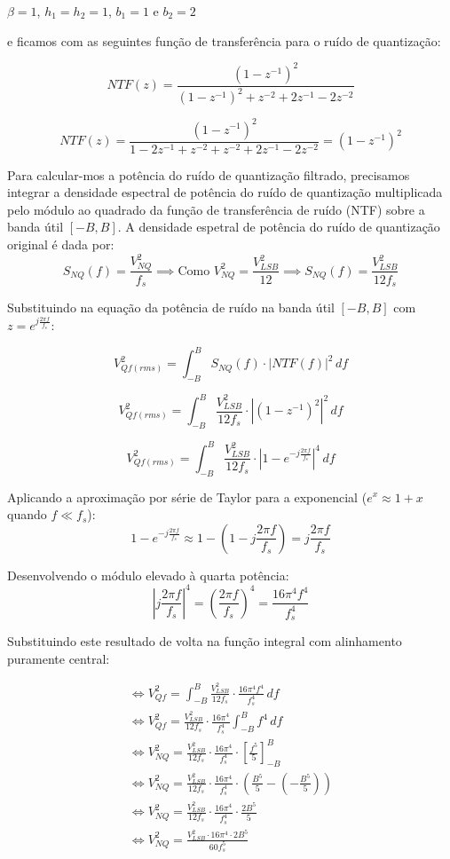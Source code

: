 \begin{center}
    $\beta = 1$, $h_1 = h_2 = 1$, $b_1 = 1$ e $b_2 = 2$
\end{center}

e ficamos com as seguintes função de transferência para o ruído de quantização:

\[ NTF(z) = \frac{(1 - z^{-1})^2}{(1 - z^{-1})^2 + z^{-2} + 2z^{-1} - 2z^{-2}} \]

\[ NTF(z) = \frac{(1 - z^{-1})^2}{1 - 2z^{-1} + z^{-2} + z^{-2} + 2z^{-1} - 2z^{-2}} = (1 - z^{-1})^2 \]

Para calcular-mos a potência do ruído de quantização filtrado, precisamos integrar a densidade espectral de
potência do ruído de quantização multiplicada pelo módulo ao quadrado da função de transferência de ruído (NTF) sobre a banda útil $[-B, B]$.
A densidade espetral de potência do ruído de quantização original é dada por:
\[ S_{NQ}(f) = \frac{V_{NQ}^2}{f_s} \implies \text{Como } V_{NQ}^2 = \frac{V_{LSB}^2}{12} \implies S_{NQ}(f) = \frac{V_{LSB}^2}{12f_s} \]

Substituindo na equação da potência de ruído na banda útil $[-B, B]$ com $z = e^{j\frac{2\pi f}{f_s}}$:

\[ V_{Qf(rms)}^2 = \int_{-B}^{B} S_{NQ}(f) \cdot |NTF(f)|^2 \, df \]

\[ V_{Qf(rms)}^2 = \int_{-B}^{B} \frac{V_{LSB}^2}{12f_s} \cdot \left| (1 - z^{-1})^2 \right|^2 \, df \]

\[ V_{Qf(rms)}^2 = \int_{-B}^{B} \frac{V_{LSB}^2}{12f_s} \cdot \left| 1 - e^{-j\frac{2\pi f}{f_s}} \right|^4 \, df \]

Aplicando a aproximação por série de Taylor para a exponencial ($e^x \approx 1 + x$ quando $f \ll f_s$):
\[ 1 - e^{-j\frac{2\pi f}{f_s}} \approx 1 - \left(1 - j\frac{2\pi f}{f_s}\right) = j\frac{2\pi f}{f_s} \]

Desenvolvendo o módulo elevado à quarta potência:
\[ \left| j\frac{2\pi f}{f_s} \right|^4 = \left(\frac{2\pi f}{f_s}\right)^4 = \frac{16\pi^4 f^4}{f_s^4} \]

Substituindo este resultado de volta na função integral com alinhamento puramente central:

\begin{gather*}
    \iff V_{Qf}^2 = \int_{-B}^{B} \frac{V_{LSB}^2}{12f_s} \cdot \frac{16\pi^4 f^4}{f_s^4} \, df \\[2ex]
    \iff V_{Qf}^2 = \frac{V_{LSB}^2}{12f_s} \cdot \frac{16\pi^4}{f_s^4} \int_{-B}^{B} f^4 \, df \\[2ex]
    \iff V_{NQ}^2 = \frac{V_{LSB}^2}{12f_s} \cdot \frac{16\pi^4}{f_s^4} \cdot \left[ \frac{f^5}{5} \right]_{-B}^{B} \\[2ex]
    \iff V_{NQ}^2 = \frac{V_{LSB}^2}{12f_s} \cdot \frac{16\pi^4}{f_s^4} \cdot \left( \frac{B^5}{5} - \left(-\frac{B^5}{5}\right) \right) \\[2ex]
    \iff V_{NQ}^2 = \frac{V_{LSB}^2}{12f_s} \cdot \frac{16\pi^4}{f_s^4} \cdot \frac{2B^5}{5} \\[2ex]
    \iff V_{NQ}^2 = \frac{V_{LSB}^2 \cdot 16\pi^4 \cdot 2B^5}{60 f_s^5}
\end{gather*}

